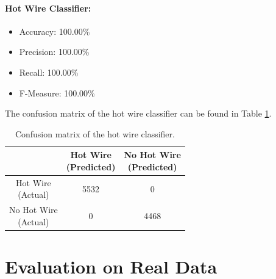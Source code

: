 \paragraph{Hot Wire Classifier:}
\begin{itemize}
  \item Accuracy: 100.00\%
  \item Precision: 100.00\%
  \item Recall: 100.00\%
  \item F-Measure: 100.00\%
\end{itemize}
The confusion matrix of the hot wire classifier can be found in Table
\ref{tbl:confusion-hotwire}.
\begin{table}[h]
  \centering
  \renewcommand\theadfont{\bfseries}
  \begin{tabular}{|c|c|c|}
    \hline
    & \thead{Hot Wire\\(Predicted)} & \thead{No Hot Wire\\(Predicted)} \\
    \hline
    \thead{Hot Wire\\(Actual)} & 5532 & 0\\
    \hline
    \thead{No Hot Wire\\(Actual)} & 0 & 4468\\
    \hline
  \end{tabular}
  \caption{Confusion matrix of the hot wire classifier.}
  \label{tbl:confusion-hotwire}
\end{table}

\section{Evaluation on Real Data}
